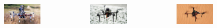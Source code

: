 \documentclass[aspectratio=169]{beamer}
\begin{document}
\begin{frame}
\begin{columns}[c]
    \begin{figure}
      \centering
      \includegraphics[width=1.0\textwidth]{./fig/uavs/f550_real.jpg}
    \end{figure}


    \begin{figure}
      \centering
      \includegraphics[width=1.0\textwidth]{./fig/uavs/x500_real.jpg}
    \end{figure}

    \vspace{-1em}

    \begin{figure}
      \centering
      \includegraphics[width=1.0\textwidth]{./fig/uavs/t650_real.jpg}
    \end{figure}


\end{columns}
\end{frame}
\end{document}
